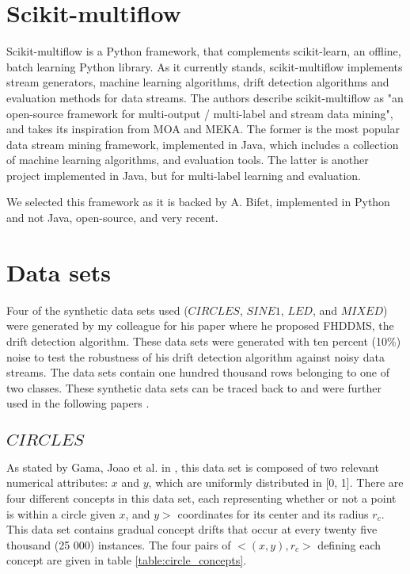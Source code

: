 \section{Scikit-multiflow}
Scikit-multiflow \cite{skmultiflow} is a Python framework, that complements scikit-learn, an offline, batch learning Python library. As it currently stands, scikit-multiflow implements stream generators, machine learning algorithms, drift detection algorithms and evaluation methods for data streams. The authors describe scikit-multiflow as "an open-source framework for multi-output / multi-label and stream data mining", and takes its inspiration from MOA and MEKA. The former is the most popular data stream mining framework, implemented in Java, which includes a collection of machine learning algorithms, and evaluation tools. The latter is another project implemented in Java, but for multi-label learning and evaluation.

We selected this framework as it is backed by A. Bifet, implemented in Python and not Java, open-source, and very recent.

\section{Data sets}
Four of the synthetic data sets used ($CIRCLES$, $SINE1$, $LED$, and $MIXED$) were generated by my colleague for his paper \cite{pesaranghader2016fast} where he proposed FHDDMS, the drift detection algorithm. These data sets were generated with ten percent (10\%) noise to test the robustness of his drift detection algorithm against noisy data streams. The data sets contain one hundred thousand rows belonging to one of two classes. These synthetic data sets can be traced back to \cite{10.1007/3-540-59286-5_74} and were further used in the following papers \cite{nishida2007detecting, gama2004learning, baena2006early}. %

\subsection{$CIRCLES$}
As stated by Gama, Joao et al. in \cite{gama2004learning}, this data set is composed of two relevant numerical attributes: $x$ and $y$, which are uniformly distributed in [0, 1]. There are four different concepts in this data set, each representing whether or not a point is within a circle given $x$, and $y>$ coordinates for its center and its radius $r_c$. This data set contains gradual concept drifts that occur at every twenty five thousand (25 000) instances. The four pairs of $<(x,y), r_c>$ defining each concept are given in table \ref{table:circle_concepts}.

